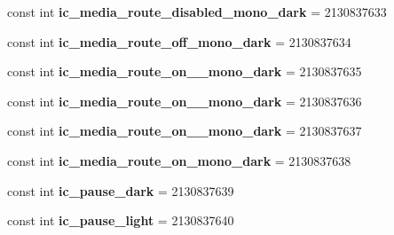 \begin{DoxyCompactItemize}
const int {\bfseries ic\+\_\+media\+\_\+route\+\_\+disabled\+\_\+mono\+\_\+dark} = 2130837633
\item 
\mbox{\label{class_pinned_app_1_1_droid_1_1_resource_1_1_drawable_a568b98647ece187ea2511cb2e05a88b6}} 
const int {\bfseries ic\+\_\+media\+\_\+route\+\_\+off\+\_\+mono\+\_\+dark} = 2130837634
\item 
\mbox{\label{class_pinned_app_1_1_droid_1_1_resource_1_1_drawable_a1247c00a8fc5b323141a1e76b8561b7b}} 
const int {\bfseries ic\+\_\+media\+\_\+route\+\_\+on\+\_\+\_\+mono\+\_\+dark} = 2130837635
\item 
\mbox{\label{class_pinned_app_1_1_droid_1_1_resource_1_1_drawable_a61092abd0e3836819abddc1fe819e211}} 
const int {\bfseries ic\+\_\+media\+\_\+route\+\_\+on\+\_\+\_\+mono\+\_\+dark} = 2130837636
\item 
\mbox{\label{class_pinned_app_1_1_droid_1_1_resource_1_1_drawable_a6f41718e2dfeaef3cf14b2584426721b}} 
const int {\bfseries ic\+\_\+media\+\_\+route\+\_\+on\+\_\+\_\+mono\+\_\+dark} = 2130837637
\item 
\mbox{\label{class_pinned_app_1_1_droid_1_1_resource_1_1_drawable_afe067df6c32a5a63b7cbd294393a57d8}} 
const int {\bfseries ic\+\_\+media\+\_\+route\+\_\+on\+\_\+mono\+\_\+dark} = 2130837638
\item 
\mbox{\label{class_pinned_app_1_1_droid_1_1_resource_1_1_drawable_a7291287db144ab5a1a70e57d70e8f067}} 
const int {\bfseries ic\+\_\+pause\+\_\+dark} = 2130837639
\item 
\mbox{\label{class_pinned_app_1_1_droid_1_1_resource_1_1_drawable_ae7e0ce29dda7704777a7a87b908d9217}} 
const int {\bfseries ic\+\_\+pause\+\_\+light} = 2130837640
\item 
\mbox{\label{class_pinned_app_1_1_droid_1_1_resource_1_1_drawable_a243d3bad969c214821851d9e25f8b820}} 

\end{DoxyCompactItemize}
